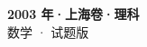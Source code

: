 \documentclass[zihao=-4, a4paper]{ctexart}
\begin{document}
\begin{center}
  {\Large\bfseries 2003 年·上海卷·理科}\\[4pt]
  {\large 数学 · 试题版}
\end{center}
\medskip
{}

\end{document}
